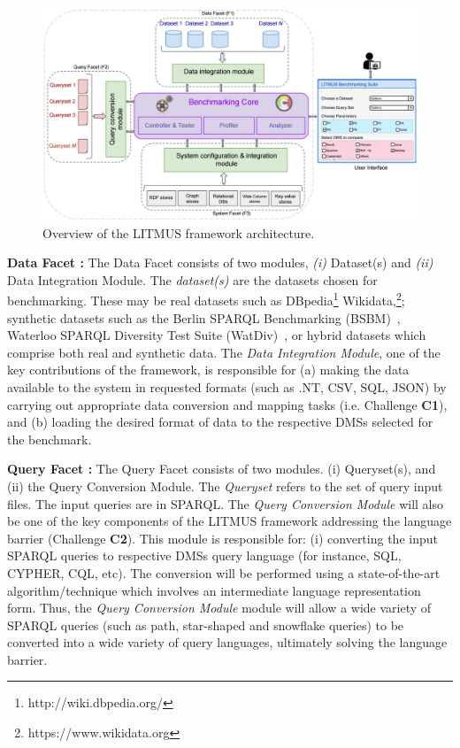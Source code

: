 \documentclass{llncs}
\begin{document}
        \begin{figure}[h]
            \centering
            \includegraphics[scale=0.18]{images/benchmark_arch_latest_new}
            \caption{Overview of the LITMUS framework architecture.}
            \label{fig:benchmark_arch}
        \end{figure}
        
        \textbf{Data Facet :} The Data Facet consists of two modules, \textit{(i)} Dataset(s) and \textit{(ii)} Data Integration Module. The \textit{dataset(s)} are the datasets chosen for benchmarking. These may be real datasets such as DBpedia\footnote{http://wiki.dbpedia.org/} Wikidata,\footnote{https://www.wikidata.org}; synthetic datasets such as the Berlin SPARQL Benchmarking (BSBM)~\cite{bizer2008benchmarking,Bizer2009TheBS}, Waterloo SPARQL Diversity Test Suite (WatDiv)~\cite{alucc2014diversified}, or hybrid datasets which comprise both real and synthetic data. 
        The \textit{Data Integration Module}, one of the key contributions of the framework, is responsible for (a) making the data available to the system in requested formats (such as .NT, CSV, SQL, JSON) by carrying out appropriate data conversion and mapping tasks (i.e. Challenge \textbf{C1}), and (b) loading the desired format of data to the respective DMSs selected for the benchmark. 
        
        \textbf{Query Facet :} The Query Facet consists of two modules. (i) Queryset(s), and (ii) the Query Conversion Module. The \textit{Queryset} refers to the set of query input files. The input queries are in SPARQL. The \textit{Query Conversion Module} will also be one of the key components of the LITMUS framework addressing the language barrier (Challenge \textbf{C2}). This module is responsible for: (i) converting the input SPARQL queries to respective DMSs query language (for instance, SQL, CYPHER, CQL, etc). The conversion will be performed using a state-of-the-art algorithm/technique which involves an intermediate language representation form. Thus, the \textit{Query Conversion Module} module will allow a wide variety of SPARQL queries (such as path, star-shaped and snowflake queries) to be converted into a wide variety of query languages, ultimately solving the language barrier.
        
\end{document}

